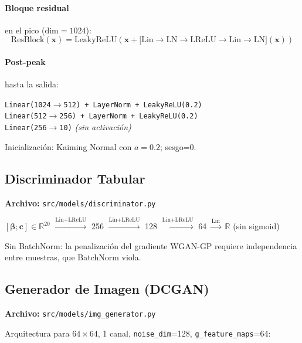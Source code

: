 \documentclass[a4paper,11pt]{article}
\begin{document}
\paragraph{Bloque residual} en el pico ($\text{dim}=1024$):
\[
    \text{ResBlock}(\bm{x}) = \text{LeakyReLU}\!\left(\bm{x}
    + \bigl[\text{Lin}\to\text{LN}\to\text{LReLU}\to\text{Lin}\to\text{LN}\bigr](\bm{x})\right)
\]

\paragraph{Post-peak} hasta la salida:
\begin{center}
\texttt{Linear(1024$\to$512) + LayerNorm + LeakyReLU(0.2)} \\
\texttt{Linear(512$\to$256) + LayerNorm + LeakyReLU(0.2)} \\
\texttt{Linear(256$\to$10)} \hspace{0.5em} \textit{(sin activación)}
\end{center}

Inicialización: Kaiming Normal con $a=0.2$; sesgo=0.

\subsection{Discriminador Tabular}

\textbf{Archivo:} \texttt{src/models/discriminator.py}

\begin{center}
$[\bm{\beta};\bm{c}]\in\mathbb{R}^{20}$
$\xrightarrow{\text{Lin}+\text{LReLU}}$ 256
$\xrightarrow{\text{Lin}+\text{LReLU}}$ 128
$\xrightarrow{\text{Lin}+\text{LReLU}}$ 64
$\xrightarrow{\text{Lin}}$ $\mathbb{R}$ (sin sigmoid)
\end{center}

Sin BatchNorm: la penalización del gradiente WGAN-GP requiere independencia
entre muestras, que BatchNorm viola.

\subsection{Generador de Imagen (DCGAN)}

\textbf{Archivo:} \texttt{src/models/img\_generator.py}

Arquitectura para $64\times64$, 1 canal, \texttt{noise\_dim}=128,
\texttt{g\_feature\_maps}=64:
\end{document}
